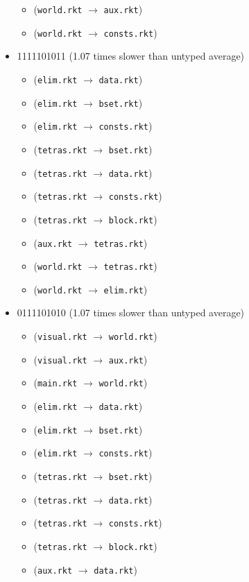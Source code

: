 \documentclass{article}
\newcommand{\mono}[1]{\texttt{#1}}
\begin{document}
\begin{itemize}
\begin{itemize}
  \item (\mono{world.rkt} $\rightarrow$ \mono{aux.rkt})
  \item (\mono{world.rkt} $\rightarrow$ \mono{consts.rkt})
  \end{itemize}
\item 1111101011 (1.07 times slower than untyped average)
  \begin{itemize}
  \item (\mono{elim.rkt} $\rightarrow$ \mono{data.rkt})
  \item (\mono{elim.rkt} $\rightarrow$ \mono{bset.rkt})
  \item (\mono{elim.rkt} $\rightarrow$ \mono{consts.rkt})
  \item (\mono{tetras.rkt} $\rightarrow$ \mono{bset.rkt})
  \item (\mono{tetras.rkt} $\rightarrow$ \mono{data.rkt})
  \item (\mono{tetras.rkt} $\rightarrow$ \mono{consts.rkt})
  \item (\mono{tetras.rkt} $\rightarrow$ \mono{block.rkt})
  \item (\mono{aux.rkt} $\rightarrow$ \mono{tetras.rkt})
  \item (\mono{world.rkt} $\rightarrow$ \mono{tetras.rkt})
  \item (\mono{world.rkt} $\rightarrow$ \mono{elim.rkt})
  \end{itemize}
\item 0111101010 (1.07 times slower than untyped average)
  \begin{itemize}
  \item (\mono{visual.rkt} $\rightarrow$ \mono{world.rkt})
  \item (\mono{visual.rkt} $\rightarrow$ \mono{aux.rkt})
  \item (\mono{main.rkt} $\rightarrow$ \mono{world.rkt})
  \item (\mono{elim.rkt} $\rightarrow$ \mono{data.rkt})
  \item (\mono{elim.rkt} $\rightarrow$ \mono{bset.rkt})
  \item (\mono{elim.rkt} $\rightarrow$ \mono{consts.rkt})
  \item (\mono{tetras.rkt} $\rightarrow$ \mono{bset.rkt})
  \item (\mono{tetras.rkt} $\rightarrow$ \mono{data.rkt})
  \item (\mono{tetras.rkt} $\rightarrow$ \mono{consts.rkt})
  \item (\mono{tetras.rkt} $\rightarrow$ \mono{block.rkt})
  \item (\mono{aux.rkt} $\rightarrow$ \mono{data.rkt})

\end{itemize}
\end{itemize}
\end{document}
